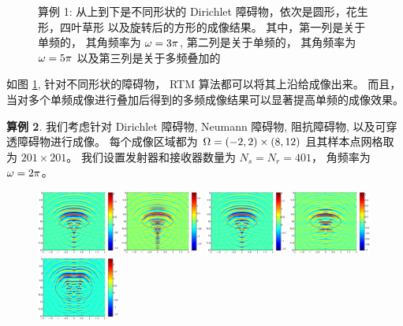 {\begin{figure}[htbp]
	\caption{算例 1: 从上到下是不同形状的 Dirichlet 障碍物，依次是圆形，花生形，四叶草形 以及旋转后的方形的成像结果。 其中，第一列是关于单频的， 其角频率为 $\omega=3\pi$, 第二列是关于单频的， 其角频率为 $\omega=5\pi$ 以及第三列是关于多频叠加的}\label{figure_21}
\end{figure}
如图 \ref{figure_21}, 针对不同形状的障碍物， RTM 算法都可以将其上沿给成像出来。 而且， 当对多个单频成像进行叠加后得到的多频成像结果可以显著提高单频的成像效果。

\bigskip
\textbf{算例 2}.
我们考虑针对 Dirichlet 障碍物,  Neumann 障碍物, 阻抗障碍物, 以及可穿透障碍物进行成像。 每个成像区域都为 $\Omega=(-2,2) \times (8, 12)$ 且其样本点网格取为 $201 \times 201$。 我们设置发射器和接收器数量为 $N_s = N_r = 401$， 角频率为 $\omega=2\pi$。 
\begin{figure}[htbp]
	\centering
	\includegraphics[width=0.24\textwidth]{./Img/graphic/circle_3pi.eps}
	\includegraphics[width=0.24\textwidth]{./Img/graphic/circle_3pi_neumann.eps}
	\includegraphics[width=0.24\textwidth]{./Img/graphic/circle_3pi_impedance_1.eps}
	\includegraphics[width=0.24\textwidth]{./Img/graphic/circle_3pi_transmission.eps}
	\includegraphics[width=0.24\textwidth]{./Img/graphic/peanut_3pi.eps}

\end{figure}}
